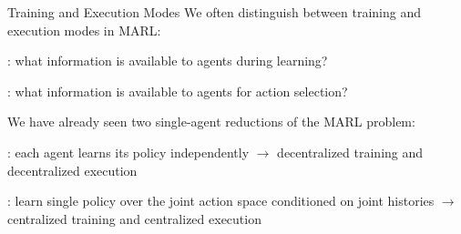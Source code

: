 \begin{frame}[t]{Training and Execution Modes}
    We often distinguish between training and execution modes in MARL:
    \blist
        \item {}: what information is available to agents during learning?
        \item {}: what information is available to agents for action selection?
    \elist

    \vspace{-.5em}

    \pause

    \begin{reminderbox}
        We have already seen two single-agent reductions of the MARL problem:

        \blist
            \item<3-> : each agent learns its policy independently
                $\rightarrow$ decentralized training and decentralized execution
            \item<4-> : learn single policy over the joint action space conditioned on joint histories $\rightarrow$ centralized training and centralized execution
        \elist

        \vspace{-1em}
    \end{reminderbox}


\end{frame}

%
%
%
%

